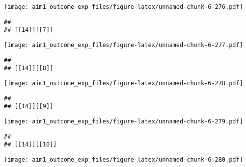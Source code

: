 \documentclass[
]{article}
\begin{document}
\texttt{[image: aim1\_outcome\_exp\_files/figure-latex/unnamed-chunk-6-276.pdf]}

\begin{verbatim}
## 
## [[14]][[7]]
\end{verbatim}

\texttt{[image: aim1\_outcome\_exp\_files/figure-latex/unnamed-chunk-6-277.pdf]}

\begin{verbatim}
## 
## [[14]][[8]]
\end{verbatim}

\texttt{[image: aim1\_outcome\_exp\_files/figure-latex/unnamed-chunk-6-278.pdf]}

\begin{verbatim}
## 
## [[14]][[9]]
\end{verbatim}

\texttt{[image: aim1\_outcome\_exp\_files/figure-latex/unnamed-chunk-6-279.pdf]}

\begin{verbatim}
## 
## [[14]][[10]]
\end{verbatim}

\texttt{[image: aim1\_outcome\_exp\_files/figure-latex/unnamed-chunk-6-280.pdf]}
\end{document}
